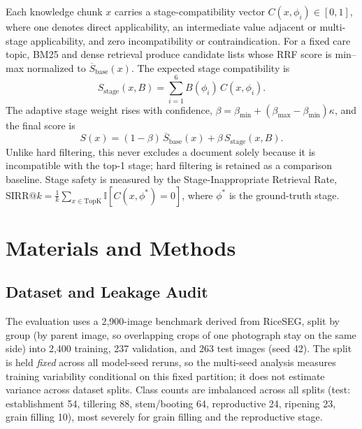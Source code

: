 \documentclass[conference]{IEEEtran}
\begin{document}
Each knowledge chunk $x$ carries a stage-compatibility vector $C(x,\phi_i)\in[0,1]$, where one denotes direct applicability, an intermediate value adjacent or multi-stage applicability, and zero incompatibility or contraindication. For a fixed care topic, BM25 and dense retrieval produce candidate lists whose RRF score is min--max normalized to $\overline{S}_{\mathrm{base}}(x)$. The expected stage compatibility is
\begin{equation}
S_{\mathrm{stage}}(x,B)=\sum_{i=1}^{6}B(\phi_i)\,C(x,\phi_i).
\end{equation}
The adaptive stage weight rises with confidence, $\beta=\beta_{\min}+(\beta_{\max}-\beta_{\min})\kappa$, and the final score is
\begin{equation}
S(x)=(1-\beta)\,\overline{S}_{\mathrm{base}}(x)+\beta\,S_{\mathrm{stage}}(x,B).
\end{equation}
Unlike hard filtering, this never excludes a document solely because it is incompatible with the top-1 stage; hard filtering is retained as a comparison baseline. Stage safety is measured by the Stage-Inappropriate Retrieval Rate, $\mathrm{SIRR}@k=\frac{1}{k}\sum_{x\in\mathrm{TopK}}\mathbb{I}[C(x,\phi^*)=0]$, where $\phi^*$ is the ground-truth stage.

\section{Materials and Methods}

\subsection{Dataset and Leakage Audit}

The evaluation uses a 2{,}900-image benchmark derived from RiceSEG, split by group (by parent image, so overlapping crops of one photograph stay on the same side) into 2{,}400 training, 237 validation, and 263 test images (seed 42). The split is held \emph{fixed} across all model-seed reruns, so the multi-seed analysis measures training variability conditional on this fixed partition; it does not estimate variance across dataset splits. Class counts are imbalanced across all splits (test: establishment 54, tillering 88, stem/booting 64, reproductive 24, ripening 23, grain filling 10), most severely for grain filling and the reproductive stage.
\end{document}
